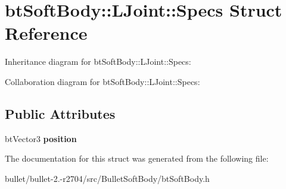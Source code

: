 \hypertarget{structbt_soft_body_1_1_l_joint_1_1_specs}{\section{bt\+Soft\+Body\+:\+:L\+Joint\+:\+:Specs Struct Reference}
\label{structbt_soft_body_1_1_l_joint_1_1_specs}
}


Inheritance diagram for bt\+Soft\+Body\+:\+:L\+Joint\+:\+:Specs\+:


Collaboration diagram for bt\+Soft\+Body\+:\+:L\+Joint\+:\+:Specs\+:
\subsection*{Public Attributes}
\begin{DoxyCompactItemize}
\item 
\hypertarget{structbt_soft_body_1_1_l_joint_1_1_specs_abe696eb6c83d211fb066bf42709550a7}{bt\+Vector3 {\bfseries position}}\label{structbt_soft_body_1_1_l_joint_1_1_specs_abe696eb6c83d211fb066bf42709550a7}

\end{DoxyCompactItemize}


The documentation for this struct was generated from the following file\+:\begin{DoxyCompactItemize}
\item 
bullet/bullet-\/2.-\/r2704/src/\+Bullet\+Soft\+Body/bt\+Soft\+Body.\+h\end{DoxyCompactItemize}
